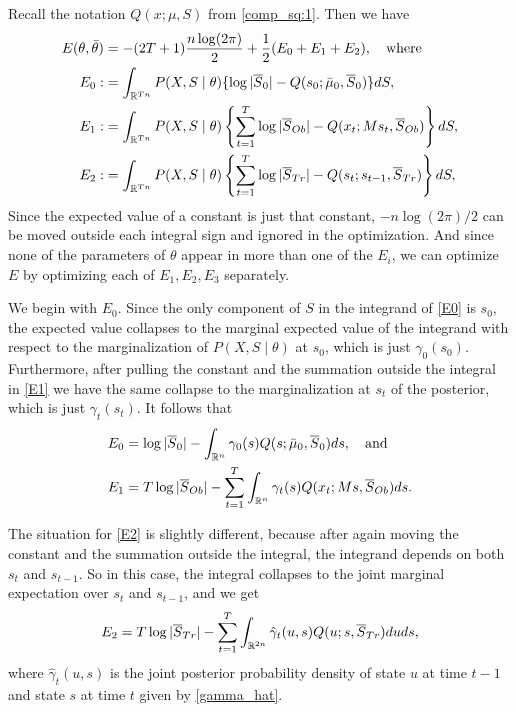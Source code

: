 \documentclass[12pt,leqno]{article}
\begin{document}
  
Recall the notation $Q(x;\mu,S)$ from \eqref{comp_sq:1}.  Then we have
\begin{align}
  E(\theta,\bar{\theta}) &= -(2T+1)\frac{n\log(2\pi)}{2} + \frac{1}{2}(E_0 + E_1 + E_2),\quad\text{where}\notag\\
  E_0 :&=\int_{{\mathbb R}^{Tn}}P(X,S\mid\theta)\{\log|\overline{S}_0| - Q(s_0;\bar{\mu}_0,\overline{S}_0)\}dS,\label{E0}\\
  E_1 :&= \int_{{\mathbb R}^{Tn}}P(X,S\mid\theta)\left\{\sum_{t=1}^T\log|\overline{S}_{Ob}| - Q(x_t;Ms_t,\overline{S}_{Ob})\right\}dS,
\label{E1}\\
  E_2 :&= \int_{{\mathbb R}^{Tn}}P(X,S\mid\theta)\left\{\sum_{t=1}^T\log|\overline{S}_{Tr}| - Q(s_t;s_{t-1},\overline{S}_{Tr})\right\}dS,
\label{E2}
\end{align}
Since the expected value of a constant is just that constant, $-n\log(2\pi)/2$ can be moved outside each
integral sign and ignored in the optimization.  And since none of the parameters of $\theta$ appear in more
than one of the $E_i$, we can optimize $E$ by optimizing each of $E_1,E_2,E_3$ separately.

We begin with $E_0$. Since the only component of $S$ in the integrand of \eqref{E0} is $s_0$, the expected value
collapses to the marginal 
expected value of the integrand with respect to the marginalization of $P(X,S\mid\theta)$ at $s_0$, which is just 
$\gamma_0(s_0)$.  Furthermore, after pulling the constant and the summation 
outside the integral in \eqref{E1} we have the same collapse to the marginalization at $s_t$ of the posterior, which
is just $\gamma_t(s_t)$.  It follows that
\begin{align*}
E_0 &= \log|\overline{S}_0| - \int_{{\mathbb R}^n}\gamma_0(s)Q(s;\bar{\mu}_0,\overline{S}_0)ds,\quad\text{and}\\
E_1 &= T\log|\overline{S}_{Ob}| - \sum_{t=1}^T\int_{{\mathbb R}^n}\gamma_t(s)Q(x_t;Ms,\overline{S}_{Ob})ds.
\end{align*}

The situation for \eqref{E2} is slightly different, because after again moving the constant and the summation outside
the integral, the integrand depends on both $s_t$ and $s_{t-1}$.  So in this case, the integral collapses to the 
joint marginal expectation over $s_t$ and $s_{t-1}$, and we get
$$
E_2 = T\log|\overline{S}_{Tr}| - \sum_{t=1}^T\int_{{\mathbb R}^{2n}}\hat{\gamma}_t(u,s)Q(u;s,\overline{S}_{Tr})duds,
$$
where $\hat{\gamma}_t(u,s)$ is the joint posterior probability density of state $u$ at time $t-1$ and state $s$ 
at time $t$ given by \eqref{gamma_hat}.
\end{document}
